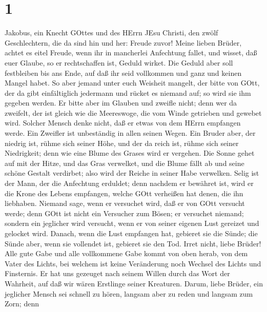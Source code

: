\hypertarget{section}{%
\section{1}\label{section}}

 Jakobus, ein Knecht GOttes und des HErrn JEsu Christi, den
zwölf Geschlechtern, die da sind hin und her: Freude zuvor! 
Meine lieben Brüder, achtet es eitel Freude, wenn ihr in mancherlei
Anfechtung fallet,  und wisset, daß euer Glaube, so er
rechtschaffen ist, Geduld wirket.  Die Geduld aber soll
festbleiben bis ans Ende, auf daß ihr seid vollkommen und ganz und
keinen Mangel habet.  So aber jemand unter euch Weisheit
mangelt, der bitte von GOtt, der da gibt einfältiglich jedermann und
rücket es niemand auf; so wird sie ihm gegeben werden.  Er
bitte aber im Glauben und zweifle nicht; denn wer da zweifelt, der ist
gleich wie die Meereswoge, die vom Winde getrieben und gewebet wird.
 Solcher Mensch denke nicht, daß er etwas von dem HErrn
empfangen werde.  Ein Zweifler ist unbeständig in allen
seinen Wegen.  Ein Bruder aber, der niedrig ist, rühme sich
seiner Höhe,  und der da reich ist, rühme sich seiner
Niedrigkeit; denn wie eine Blume des Grases wird er vergehen.
 Die Sonne gehet auf mit der Hitze, und das Gras verwelket,
und die Blume fällt ab und seine schöne Gestalt verdirbet; also wird der
Reiche in seiner Habe verwelken.  Selig ist der Mann, der
die Anfechtung erduldet; denn nachdem er bewähret ist, wird er die Krone
des Lebens empfangen, welche GOtt verheißen hat denen, die ihn
liebhaben.  Niemand sage, wenn er versuchet wird, daß er
von GOtt versucht werde; denn GOtt ist nicht ein Versucher zum Bösen; er
versuchet niemand;  sondern ein jeglicher wird versucht,
wenn er von seiner eigenen Lust gereizet und gelocket wird.
 Danach, wenn die Lust empfangen hat, gebieret sie die
Sünde; die Sünde aber, wenn sie vollendet ist, gebieret sie den Tod.
 Irret nicht, liebe Brüder!  Alle gute Gabe
und alle vollkommene Gabe kommt von oben herab, von dem Vater des
Lichts, bei welchem ist keine Veränderung noch Wechsel des Lichts und
Finsternis.  Er hat uns gezeuget nach seinem Willen durch
das Wort der Wahrheit, auf daß wir wären Erstlinge seiner Kreaturen.
 Darum, liebe Brüder, ein jeglicher Mensch sei schnell zu
hören, langsam aber zu reden und langsam zum Zorn;  denn
